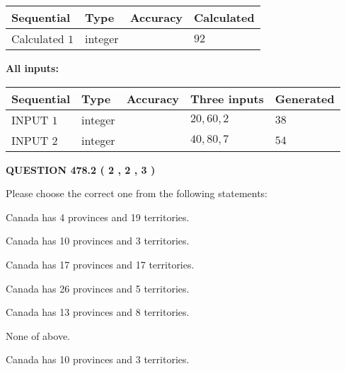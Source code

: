 \documentclass[12pt]{article}
\begin{document}
   
  
  
\noindent\begin{tabular}{|l|l|l|l|}
\hline
 Sequential & Type & Accuracy & Calculated \\ 
\hline
 
 
  Calculated $  1 $ & integer &  & 
  $ 92 $ 
 \\  \hline  
 \end{tabular}
   
   
   
   
\noindent\vspace{0.1in}\hspace{-0.08in} {\textbf{\Large{All inputs: }}}
   
   
  
  
\noindent\begin{tabular}{|l|l|l|l|l|}
\hline
 Sequential & Type & Accuracy & Three inputs & Generated \\ 
\hline
 
 
  INPUT $  1 $ & integer &  & $
 20
 , 
 60
 , 
 2
 $ & $ 38 $ 
 \\  \hline  
 
 
  INPUT $  2 $ & integer &  & $
 40
 , 
 80
 , 
 7
 $ & $ 54 $ 
 \\  \hline  
 \end{tabular}
   
   
  
\vspace{0.2in}
  
{\textbf{\Large{QUESTION
478.2 
 ( 2 , 2 , 3 )
}}}
  
  
Please choose the correct one from the following statements:
 
 
Canada has   4 provinces and  19 territories.
 
 
Canada has 10  provinces and 3 territories.
 
 
Canada has  17 provinces and  17 territories.
 
 
Canada has  26 provinces and  5 territories.
 
 
Canada has  13 provinces and  8 territories.
 
 
 None of above.
 
 
\noindent{}
 
 
Canada has 10  provinces and 3 territories.
 
\end{document}
